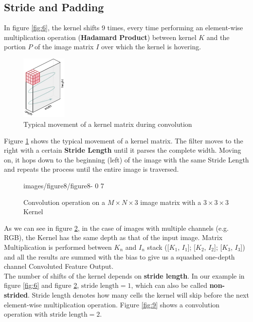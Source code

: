 \subsection{Stride and Padding}
In figure \ref{fig:6}, the kernel shifts 9 times, every time performing an element-wise multiplication operation (\textbf{Hadamard Product}) between kernel $K$ and the portion $P$ of the image matrix $I$ over which the kernel is hovering.\\

\begin{figure}[h!]
    \centering
    \includegraphics[width=0.2\textwidth]{images/figure7.png}
    \caption{Typical movement of a kernel matrix during convolution}
    \label{fig:7}
\end{figure}

Figure \ref{fig:7} shows the typical movement of a kernel matrix. The filter moves to the right with a certain \textbf{Stride Length} until it parses the complete width. Moving on, it hops down to the beginning (left) of the image with the same Stride Length and repeats the process until the entire image is traversed.\\

\begin{figure}
    \centering
    {images/figure8/figure8-} %
    {0} %
    {7} %
    \caption{Convolution operation on a $M \times N \times 3$ image matrix with a $3 \times 3 \times 3$ Kernel}
    \label{fig:8}
\end{figure}

As we can see in figure \ref{fig:8}, in the case of images with multiple channels (e.g. RGB), the Kernel has the same depth as that of the input image. Matrix Multiplication is performed between $K_n$ and $I_n$ stack ([$K_1$, $I_1$]; [$K_2$, $I_2$]; [$K_3$, $I_3$]) and all the results are summed with the bias to give us a squashed one-depth channel Convoluted Feature Output.\\

The number of shifts of the kernel depends on \textbf{stride length}. In our example in figure \ref{fig:6} and figure \ref{fig:8}, $\text{stride length} = 1$, which can also be called \textbf{non-strided}. Stride length denotes how many cells the kernel will skip before the next element-wise multiplication operation. Figure \ref{fig:9} shows a convolution operation with $\text{stride length} = 2$.\\


